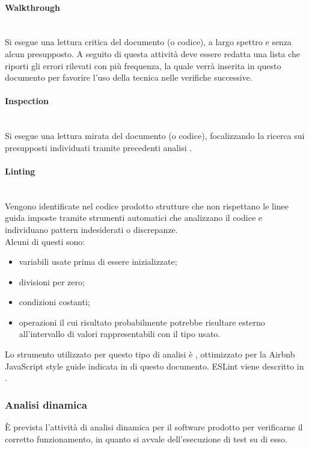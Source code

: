 \paragraph{Walkthrough} \mbox{}\\
Si esegue una lettura critica del documento (o codice), a largo spettro e senza alcun presupposto. A seguito di questa attività deve essere redatta una lista che riporti gli errori rilevati con più frequenza, la quale verrà inserita in questo documento per favorire l'uso della tecnica  nelle verifiche successive.

\paragraph{Inspection} \mbox{}\\
Si esegue una lettura mirata del documento (o codice), focalizzando la ricerca sui presupposti individuati tramite precedenti analisi .

\paragraph{Linting}\mbox{}\\
Vengono identificate nel codice prodotto strutture che non rispettano le linee guida imposte tramite strumenti automatici che analizzano il codice e individuano pattern indesiderati o discrepanze.\\
Alcuni di questi sono:\begin{itemize}
	\item variabili usate prima di essere inizializzate;  
	\item divisioni per zero;
	\item condizioni costanti;
	\item operazioni il cui risultato probabilmente potrebbe risultare esterno all'intervallo di valori rappresentabili con il tipo usato.
\end{itemize}
Lo strumento utilizzato per questo tipo di analisi è , ottimizzato per la Airbnb JavaScript style guide indicata in  di questo documento. ESLint viene descritto in .

\subsubsection{Analisi dinamica}
\`{E} prevista l’attività di analisi dinamica per il software prodotto per verificarne il corretto funzionamento, in quanto si avvale dell'esecuzione di test su di esso.
















